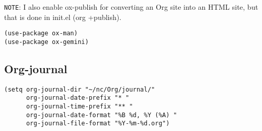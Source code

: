 \documentclass[11pt]{article}
\begin{document}
\texttt{NOTE}: I also enable ox-publish for converting an Org site into an HTML site, but that is done in init.el (org +publish).

\begin{verbatim}
(use-package ox-man)
(use-package ox-gemini)
\end{verbatim}

\subsection{Org-journal}
\label{sec:orga914e44}
\begin{verbatim}
(setq org-journal-dir "~/nc/Org/journal/"
      org-journal-date-prefix "* "
      org-journal-time-prefix "** "
      org-journal-date-format "%B %d, %Y (%A) "
      org-journal-file-format "%Y-%m-%d.org")
\end{verbatim}
\end{document}
